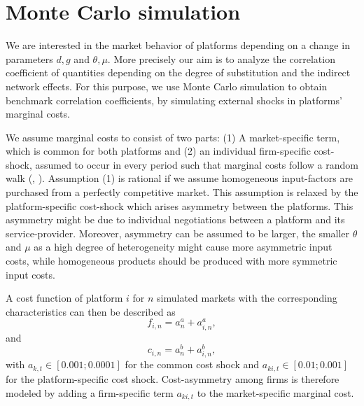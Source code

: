 \documentclass[12pt,a4paper]{scrreprt}
\begin{document}




\chapter{Monte Carlo simulation}

We are interested in the market behavior of platforms depending on a change in parameters $d, g$ and $\theta, \mu$. More precisely our aim is to analyze the correlation coefficient of quantities depending on the degree of substitution and the indirect network effects. For this purpose, we use Monte Carlo simulation to obtain benchmark correlation coefficients, by simulating external shocks in platforms' marginal costs. 

We assume marginal costs to consist of two parts: (1) A market-specific term, which is common for both platforms and (2) an individual firm-specific cost-shock, assumed to occur in every period such that marginal costs follow a random walk (\cite[241]{harrington_detecting_2008}, \cite{paha_empirical_2011}). Assumption (1) is rational if we assume homogeneous input-factors are purchased from a perfectly competitive market. This assumption is relaxed by the platform-specific cost-shock which arises asymmetry between the platforms. This asymmetry might be due to individual negotiations between a platform and its service-provider. Moreover, asymmetry can be assumed to be larger, the smaller $\theta$ and $\mu$ as a high degree of heterogeneity might cause more asymmetric input costs, while homogeneous products should be produced with more symmetric input costs. 



A cost function of platform $i$ for $n$ simulated markets with the corresponding characteristics can then be described as
\begin{equation}
f_{i,n} = a^a_n+a^a_{i,n},
\end{equation} and 
\begin{equation}
c_{i,n} = a^b_n+a^b_{i,n},
\end{equation}
with $a_{k,t} \in [0.001;0.0001]$ for the common cost shock and $a_{ki,t} \in [0.01;0.001] $ for the platform-specific cost shock. Cost-asymmetry among firms is therefore modeled by adding a firm-specific term $a_{ki,t}$ to the market-specific marginal cost. 
\end{document}
